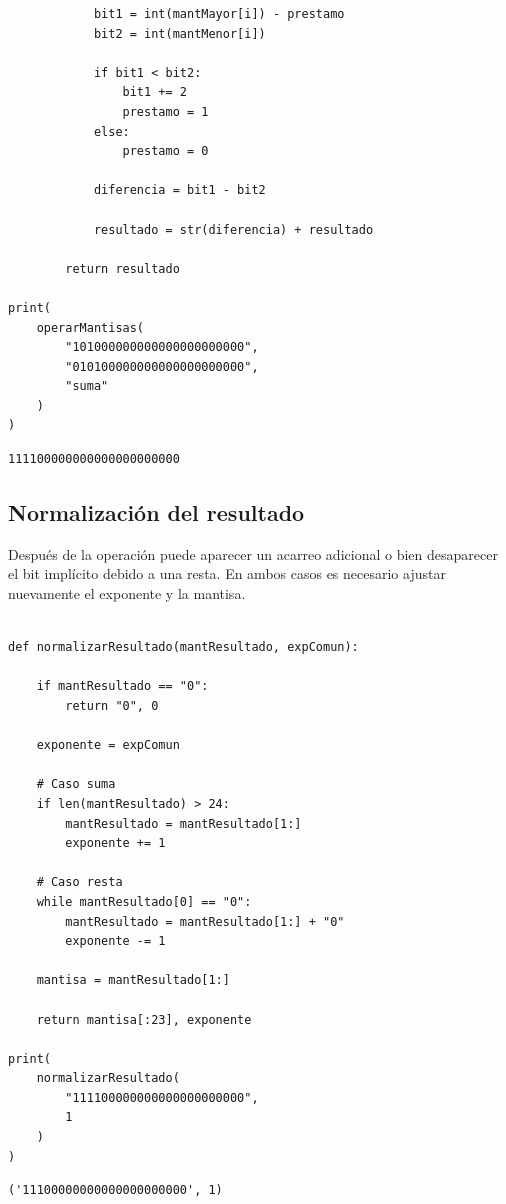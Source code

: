\documentclass[11pt]{article}
\begin{document}
\begin{verbatim}
            bit1 = int(mantMayor[i]) - prestamo
            bit2 = int(mantMenor[i])

            if bit1 < bit2:
                bit1 += 2
                prestamo = 1
            else:
                prestamo = 0

            diferencia = bit1 - bit2

            resultado = str(diferencia) + resultado

        return resultado
          
print(
    operarMantisas(
        "101000000000000000000000",
        "010100000000000000000000",
        "suma"
    )
)

\end{verbatim}

\label{org166c318}
\begin{verbatim}
111100000000000000000000
\end{verbatim}
\subsection{Normalización del resultado}
\label{sec:org71da12f}

Después de la operación puede aparecer un acarreo adicional o bien
desaparecer el bit implícito debido a una resta. En ambos casos es
necesario ajustar nuevamente el exponente y la mantisa.

\begin{verbatim}

def normalizarResultado(mantResultado, expComun):

    if mantResultado == "0":
        return "0", 0

    exponente = expComun

    # Caso suma
    if len(mantResultado) > 24:
        mantResultado = mantResultado[1:]
        exponente += 1

    # Caso resta
    while mantResultado[0] == "0":
        mantResultado = mantResultado[1:] + "0"
        exponente -= 1

    mantisa = mantResultado[1:]

    return mantisa[:23], exponente

print(
    normalizarResultado(
        "111100000000000000000000",
        1
    )
)

\end{verbatim}

\label{org146d98f}
\begin{verbatim}
('11100000000000000000000', 1)
\end{verbatim}
\end{document}
